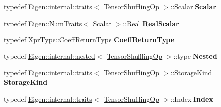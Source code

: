 \begin{DoxyCompactItemize}
typedef \hyperlink{struct_eigen_1_1internal_1_1traits}{Eigen\+::internal\+::traits}$<$ \hyperlink{class_eigen_1_1_tensor_shuffling_op}{Tensor\+Shuffling\+Op} $>$\+::Scalar {\bfseries Scalar}
\item 
\mbox{\label{class_eigen_1_1_tensor_shuffling_op_a6dc9f172dc885288920ec4ced7e6ac99}} 
typedef \hyperlink{group___core___module_struct_eigen_1_1_num_traits}{Eigen\+::\+Num\+Traits}$<$ Scalar $>$\+::Real {\bfseries Real\+Scalar}
\item 
\mbox{\label{class_eigen_1_1_tensor_shuffling_op_a644ffc01e6884a8d46e0513418bb9dd3}} 
typedef Xpr\+Type\+::\+Coeff\+Return\+Type {\bfseries Coeff\+Return\+Type}
\item 
\mbox{\label{class_eigen_1_1_tensor_shuffling_op_a2b4e2a356b1537b7c860d7537ee110bd}} 
typedef \hyperlink{struct_eigen_1_1internal_1_1nested}{Eigen\+::internal\+::nested}$<$ \hyperlink{class_eigen_1_1_tensor_shuffling_op}{Tensor\+Shuffling\+Op} $>$\+::type {\bfseries Nested}
\item 
\mbox{\label{class_eigen_1_1_tensor_shuffling_op_a44b548a9d892d758070999011d2b77e8}} 
typedef \hyperlink{struct_eigen_1_1internal_1_1traits}{Eigen\+::internal\+::traits}$<$ \hyperlink{class_eigen_1_1_tensor_shuffling_op}{Tensor\+Shuffling\+Op} $>$\+::Storage\+Kind {\bfseries Storage\+Kind}
\item 
\mbox{\label{class_eigen_1_1_tensor_shuffling_op_afa8ab8ede7a72aa3d88b43beda7a5132}} 
typedef \hyperlink{struct_eigen_1_1internal_1_1traits}{Eigen\+::internal\+::traits}$<$ \hyperlink{class_eigen_1_1_tensor_shuffling_op}{Tensor\+Shuffling\+Op} $>$\+::Index {\bfseries Index}
\end{DoxyCompactItemize}
